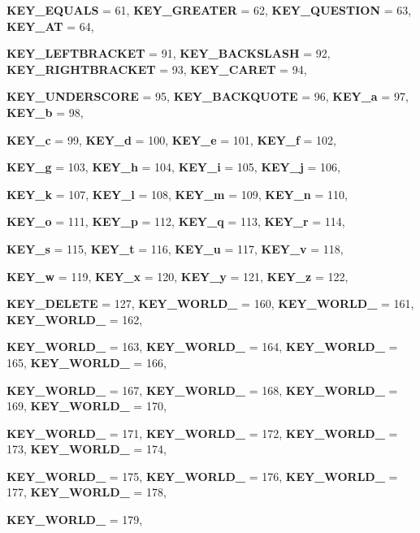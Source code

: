 \begin{DoxyCompactItemize}
\par
{\bfseries KEY\_\-EQUALS} =  61, 
{\bfseries KEY\_\-GREATER} =  62, 
{\bfseries KEY\_\-QUESTION} =  63, 
{\bfseries KEY\_\-AT} =  64, 
\par
{\bfseries KEY\_\-LEFTBRACKET} =  91, 
{\bfseries KEY\_\-BACKSLASH} =  92, 
{\bfseries KEY\_\-RIGHTBRACKET} =  93, 
{\bfseries KEY\_\-CARET} =  94, 
\par
{\bfseries KEY\_\-UNDERSCORE} =  95, 
{\bfseries KEY\_\-BACKQUOTE} =  96, 
{\bfseries KEY\_\-a} =  97, 
{\bfseries KEY\_\-b} =  98, 
\par
{\bfseries KEY\_\-c} =  99, 
{\bfseries KEY\_\-d} =  100, 
{\bfseries KEY\_\-e} =  101, 
{\bfseries KEY\_\-f} =  102, 
\par
{\bfseries KEY\_\-g} =  103, 
{\bfseries KEY\_\-h} =  104, 
{\bfseries KEY\_\-i} =  105, 
{\bfseries KEY\_\-j} =  106, 
\par
{\bfseries KEY\_\-k} =  107, 
{\bfseries KEY\_\-l} =  108, 
{\bfseries KEY\_\-m} =  109, 
{\bfseries KEY\_\-n} =  110, 
\par
{\bfseries KEY\_\-o} =  111, 
{\bfseries KEY\_\-p} =  112, 
{\bfseries KEY\_\-q} =  113, 
{\bfseries KEY\_\-r} =  114, 
\par
{\bfseries KEY\_\-s} =  115, 
{\bfseries KEY\_\-t} =  116, 
{\bfseries KEY\_\-u} =  117, 
{\bfseries KEY\_\-v} =  118, 
\par
{\bfseries KEY\_\-w} =  119, 
{\bfseries KEY\_\-x} =  120, 
{\bfseries KEY\_\-y} =  121, 
{\bfseries KEY\_\-z} =  122, 
\par
{\bfseries KEY\_\-DELETE} =  127, 
{\bfseries KEY\_\-WORLD\_} =  160, 
{\bfseries KEY\_\-WORLD\_} =  161, 
{\bfseries KEY\_\-WORLD\_} =  162, 
\par
{\bfseries KEY\_\-WORLD\_} =  163, 
{\bfseries KEY\_\-WORLD\_} =  164, 
{\bfseries KEY\_\-WORLD\_} =  165, 
{\bfseries KEY\_\-WORLD\_} =  166, 
\par
{\bfseries KEY\_\-WORLD\_} =  167, 
{\bfseries KEY\_\-WORLD\_} =  168, 
{\bfseries KEY\_\-WORLD\_} =  169, 
{\bfseries KEY\_\-WORLD\_} =  170, 
\par
{\bfseries KEY\_\-WORLD\_} =  171, 
{\bfseries KEY\_\-WORLD\_} =  172, 
{\bfseries KEY\_\-WORLD\_} =  173, 
{\bfseries KEY\_\-WORLD\_} =  174, 
\par
{\bfseries KEY\_\-WORLD\_} =  175, 
{\bfseries KEY\_\-WORLD\_} =  176, 
{\bfseries KEY\_\-WORLD\_} =  177, 
{\bfseries KEY\_\-WORLD\_} =  178, 
\par
{\bfseries KEY\_\-WORLD\_} =  179, 

\end{DoxyCompactItemize}
